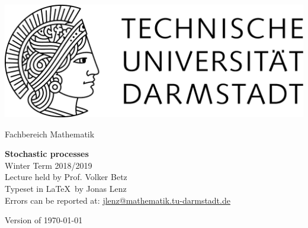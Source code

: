 \documentclass[12pt,a4paper,twoside]{scrreprt}
\begin{document}
\hypersetup{pageanchor=false}
\begin{titlepage}
  \begin{center}
    \vspace{1cm}
    \includegraphics[width=0.5\linewidth]{TU_Darmstadt_Logo.pdf}
    \vspace{1cm}
    
    \large{Fachbereich Mathematik}
    \vspace{3.5cm}
    
    \Huge{\textbf{Stochastic processes}\\}
    \vspace*{0.5cm}    
    \Large{{Winter Term 2018/2019}\\}
    \vspace*{0.5cm}    
    \small{Lecture held by Prof. Volker Betz\\}
    \vspace*{1.0cm}
    \small{Typeset in \LaTeX\ by Jonas Lenz\\}
    \small{Errors can be reported at: \url{jlenz@mathematik.tu-darmstadt.de}}

    \vspace*{\fill}
    \small{Version of \today}
  \end{center}
\end{titlepage}

\hypersetup{pageanchor=true}
\tableofcontents


%
%
%
%
\end{document}
